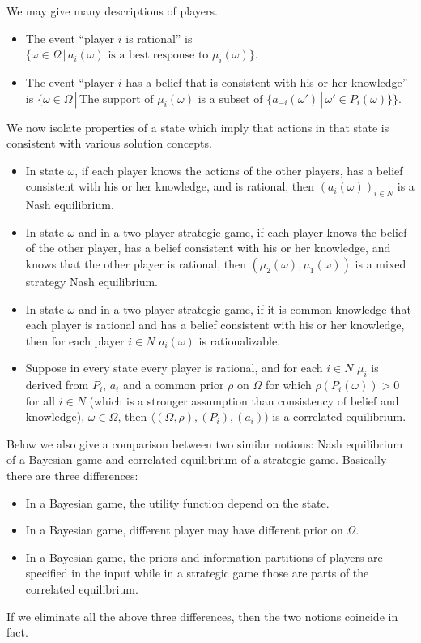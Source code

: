 \documentclass[openany]{book}
\begin{document}
We may give many descriptions of players.
\begin{itemize}
\item The event ``player $i$ is rational'' is $\{\omega\in\Omega\,|\,a_i(\omega)\textrm{ is a best response to }\mu_i(\omega)\}$.
\item The event ``player $i$ has a belief that is consistent with his or her knowledge'' is $\big\{\omega\in\Omega\,|\,\textrm{The support of }\mu_i(\omega)\textrm{ is a subset of }\{a_{-i}(\omega')\,|\,\omega'\in P_i(\omega)\}\big\}$.
\end{itemize}

We now isolate properties of a state which imply that actions in that state is consistent with various solution concepts.
\begin{itemize}
\item In state $\omega$, if each player knows the actions of the other players, has a belief consistent with his or her knowledge, and is rational, then $(a_i(\omega))_{i\in N}$ is a Nash equilibrium.
\item In state $\omega$ and in a two-player strategic game, if each player knows the belief of the other player, has a belief consistent with his or her knowledge, and knows that the other player is rational, then $(\mu_2(\omega),\mu_1(\omega))$ is a mixed strategy Nash equilibrium.
\item In state $\omega$ and in a two-player strategic game, if it is common knowledge that each player is rational and has a belief consistent with his or her knowledge, then for each player $i\in N$ $a_i(\omega)$ is rationalizable.
\item Suppose in every state every player is rational, and for each $i\in N$ $\mu_i$ is derived from $P_i$, $a_i$ and a common prior $\rho$ on $\Omega$ for which $\rho(P_i(\omega))>0$ for all $i\in N$ (which is a stronger assumption than consistency of belief and knowledge), $\omega\in\Omega$, then $\langle(\Omega,\rho),(P_i),(a_i))$ is a correlated equilibrium.
\end{itemize}

Below we also give a comparison between two similar notions: Nash equilibrium of a Bayesian game and correlated equilibrium of a strategic game. Basically there are three differences:
\begin{itemize}
\item In a Bayesian game, the utility function depend on the state.
\item In a Bayesian game, different player may have different prior on $\Omega$.
\item In a Bayesian game, the priors and information partitions of players are specified in the input while in a strategic game those are parts of the correlated equilibrium.
\end{itemize}
If we eliminate all the above three differences, then the two notions coincide in fact.
\end{document}
